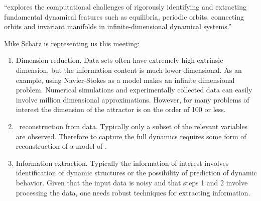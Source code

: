 \begin{description}
{``explores the computational challenges of rigorously identifying and extracting
fundamental dynamical features such as equilibria, periodic orbits, connecting
orbits and invariant manifolds in infinite-dimensional dynamical systems.''

Mike Schatz is representing us this meeting:
\begin{enumerate}
  \item
    Dimension reduction. Data sets often have extremely high extrinsic
    dimension, but the information content is much lower dimensional. As an
    example, using Navier-Stokes as a model makes
    an infinite dimensional problem. Numerical simulations and
    experimentally collected data can easily involve million dimensional
    approximations. However, for many problems of interest the dimension of the
    attractor is on the order of 100 or less.
  \item
    \Statesp\ reconstruction from data. Typically only a subset of the relevant
    variables are observed. Therefore to capture the full dynamics requires some
    form of reconstruction of a model of \statesp.
  \item
    Information extraction. Typically the information of interest involves
    identification of dynamic structures or the possibility of prediction of
    dynamic behavior. Given that the input data is noisy and that steps 1 and 2
    involve processing the data, one needs robust techniques for extracting
    information.
\end{enumerate}

        }
\end{description}
\printbibliography[heading=subbibintoc,title={References}]
